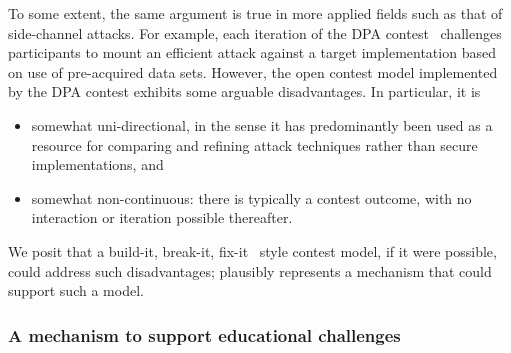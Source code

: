 To some extent, the same argument is true in more applied fields such as
that of side-channel attacks.  For example, each iteration of the DPA 
contest~\cite{SCARV:CDDEGGHKLLNOSSSSVWW:14} challenges participants to 
mount an efficient attack against a target implementation based on use
of pre-acquired data sets.  However, the open contest model implemented 
by the DPA contest exhibits some arguable disadvantages.  In particular, 
it is

\begin{itemize}
\item somewhat uni-directional, in the sense it has predominantly been 
      used as a resource for comparing and refining attack techniques 
      rather than secure implementations, 
      and
\item somewhat non-continuous: there is typically a contest outcome, 
      with no interaction or iteration possible thereafter.
\end{itemize}

\noindent
We posit that a build-it, break-it, fix-it~\cite{SCARV:RHPLMM:16} style 
contest model, if it were possible, could address such disadvantages;
\LABID plausibly represents a mechanism that could support such a model.

%
%


\subsubsection{A mechanism to support educational challenges}


